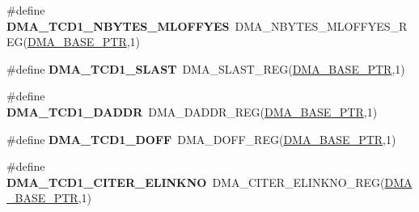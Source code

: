 \begin{DoxyCompactItemize}
\item 
\hypertarget{group___d_m_a___register___accessor___macros_gabca874a7a0dda11149a7ffbc59fd4f67}{}\#define {\bfseries D\+M\+A\+\_\+\+T\+C\+D1\+\_\+\+N\+B\+Y\+T\+E\+S\+\_\+\+M\+L\+O\+F\+F\+Y\+E\+S}~D\+M\+A\+\_\+\+N\+B\+Y\+T\+E\+S\+\_\+\+M\+L\+O\+F\+F\+Y\+E\+S\+\_\+\+R\+E\+G(\hyperlink{group___d_m_a___peripheral_ga6997fbc1b1973e9f27170217a3bd6f22}{D\+M\+A\+\_\+\+B\+A\+S\+E\+\_\+\+P\+T\+R},1)\label{group___d_m_a___register___accessor___macros_gabca874a7a0dda11149a7ffbc59fd4f67}

\item 
\hypertarget{group___d_m_a___register___accessor___macros_gac992fd61ac9973b0084946fe63e7ace5}{}\#define {\bfseries D\+M\+A\+\_\+\+T\+C\+D1\+\_\+\+S\+L\+A\+S\+T}~D\+M\+A\+\_\+\+S\+L\+A\+S\+T\+\_\+\+R\+E\+G(\hyperlink{group___d_m_a___peripheral_ga6997fbc1b1973e9f27170217a3bd6f22}{D\+M\+A\+\_\+\+B\+A\+S\+E\+\_\+\+P\+T\+R},1)\label{group___d_m_a___register___accessor___macros_gac992fd61ac9973b0084946fe63e7ace5}

\item 
\hypertarget{group___d_m_a___register___accessor___macros_ga9de728ad39398928b18756cb20c98d18}{}\#define {\bfseries D\+M\+A\+\_\+\+T\+C\+D1\+\_\+\+D\+A\+D\+D\+R}~D\+M\+A\+\_\+\+D\+A\+D\+D\+R\+\_\+\+R\+E\+G(\hyperlink{group___d_m_a___peripheral_ga6997fbc1b1973e9f27170217a3bd6f22}{D\+M\+A\+\_\+\+B\+A\+S\+E\+\_\+\+P\+T\+R},1)\label{group___d_m_a___register___accessor___macros_ga9de728ad39398928b18756cb20c98d18}

\item 
\hypertarget{group___d_m_a___register___accessor___macros_ga5357bc3c3f4f2ed192af2623a8599918}{}\#define {\bfseries D\+M\+A\+\_\+\+T\+C\+D1\+\_\+\+D\+O\+F\+F}~D\+M\+A\+\_\+\+D\+O\+F\+F\+\_\+\+R\+E\+G(\hyperlink{group___d_m_a___peripheral_ga6997fbc1b1973e9f27170217a3bd6f22}{D\+M\+A\+\_\+\+B\+A\+S\+E\+\_\+\+P\+T\+R},1)\label{group___d_m_a___register___accessor___macros_ga5357bc3c3f4f2ed192af2623a8599918}

\item 
\hypertarget{group___d_m_a___register___accessor___macros_ga9e0483f14cbe1f3dbacf9b8047cf810d}{}\#define {\bfseries D\+M\+A\+\_\+\+T\+C\+D1\+\_\+\+C\+I\+T\+E\+R\+\_\+\+E\+L\+I\+N\+K\+N\+O}~D\+M\+A\+\_\+\+C\+I\+T\+E\+R\+\_\+\+E\+L\+I\+N\+K\+N\+O\+\_\+\+R\+E\+G(\hyperlink{group___d_m_a___peripheral_ga6997fbc1b1973e9f27170217a3bd6f22}{D\+M\+A\+\_\+\+B\+A\+S\+E\+\_\+\+P\+T\+R},1)\label{group___d_m_a___register___accessor___macros_ga9e0483f14cbe1f3dbacf9b8047cf810d}


\end{DoxyCompactItemize}
